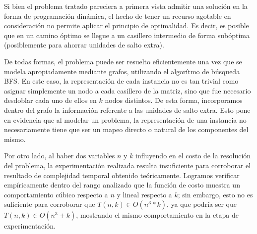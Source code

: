 Si bien el problema tratado pareciera a primera vista admitir una solución en la forma de programación dinámica, el hecho de tener un recurso agotable en consideración no permite aplicar el principio de optimalidad. Es decir, es posible que en un camino óptimo se llegue a un casillero intermedio de forma subóptima (posiblemente para ahorrar unidades de salto extra).

De todas formas, el problema puede ser resuelto eficientemente una vez que se modela apropiadamente mediante grafos, utilizando el algorítmo de búsqueda BFS. En este caso, la representación de cada instancia no es tan trivial como asignar simplemente un nodo a cada casillero de la matriz, sino que fue necesario desdoblar cada uno de ellos en $k$ nodos distintos. De esta forma, incorporamos dentro del grafo la información referente a las unidades de salto extra. Esto pone en evidencia que al modelar un problema, la representación de una instancia no necesariamente tiene que ser un mapeo directo o natural de los componentes del mismo.

Por otro lado, al haber dos variables $n$ y $k$ influyendo en el costo de la resolución del problema, la experimentación realizada resulta insuficiente para corroborar el resultado de complejidad temporal obtenido teóricamente. Logramos verificar empíricamente dentro del rango analizado que la función de costo muestra un comportamiento cúbico respecto a $n$ y lineal respecto a $k$; sin embargo, esto no es suficiente para corroborar que $T(n,k) \in O(n^3 * k)$, ya que podría ser que $T(n,k) \in O(n^3 + k)$, mostrando el mismo comportamiento en la etapa de experimentación.
